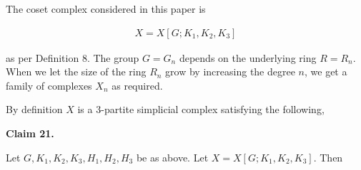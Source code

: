 \documentclass[10pt,a4paper]{article}
\begin{document}



The coset complex considered in this paper is\par


\[\begin{gathered}
X=X[G;K_{1},K_{2},K_{3}]
\end{gathered}\]


as per Definition 8. The group $G=G_{n}$ depends on the underlying ring $R=R_{n}$. When we let the size of the ring $R_{n}$ grow by increasing the degree $n$, we get a family of complexes $X_{n}$ as required.\par




By definition $X$ is a $3$-partite simplicial complex satisfying the following,\par





\par\medskip\noindent\textbf{
Claim 21. 
}\par



Let $G,K_{1},K_{2},K_{3},H_{1},H_{2},H_{3}$ be as above. Let $X=X[G;K_{1},K_{2},K_{3}]$. Then\par
\end{document}
